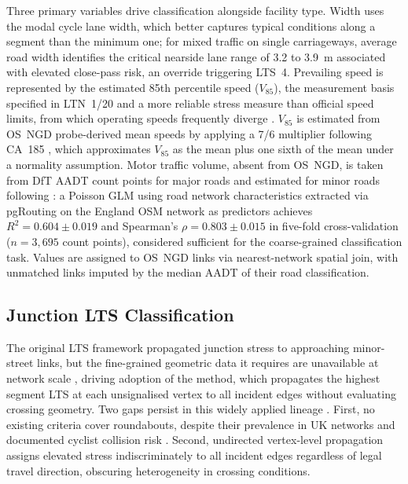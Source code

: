 \documentclass[final,5p,times,twocolumn,authoryear]{elsarticle}
\begin{document}
Three primary variables drive classification alongside facility type. Width uses the modal cycle lane width, which better captures typical conditions along a segment than the minimum one; for mixed traffic on single carriageways, average road width identifies the critical nearside lane range of 3.2 to 3.9~m associated with elevated close-pass risk, an override triggering LTS~4. Prevailing speed is represented by the estimated 85th percentile speed ($V_{85}$), the measurement basis specified in LTN~1/20 and a more reliable stress measure than official speed limits, from which operating speeds frequently diverge \citep{europeancommission2021, departmentfortransport2025b}. $V_{85}$ is estimated from OS~NGD probe-derived mean speeds by applying a 7/6 multiplier following CA~185 \citep{nationalhighways2019}, which approximates $V_{85}$ as the mean plus one sixth of the mean under a normality assumption. Motor traffic volume, absent from OS~NGD, is taken from DfT AADT count points for major roads and estimated for minor roads following \citet{morley2016}: a Poisson GLM using road network characteristics extracted via pgRouting on the England OSM network as predictors achieves $R^2 = 0.604 \pm 0.019$ and Spearman's $\rho = 0.803 \pm 0.015$ in five-fold cross-validation ($n = 3{,}695$ count points), considered sufficient for the coarse-grained classification task. Values are assigned to OS~NGD links via nearest-network spatial join, with unmatched links imputed by the median AADT of their road classification.

\subsection{Junction LTS Classification}
\label{sec:junction-lts}

The original LTS framework propagated junction stress to approaching minor-street links, but the fine-grained geometric data it requires are unavailable at network scale \citep{furth2018}, driving adoption of the \citet{conveyal2015} method, which propagates the highest segment LTS at each unsignalised vertex to all incident edges without evaluating crossing geometry. Two gaps persist in this widely applied lineage \citep{semler2017, murphy2019}. First, no existing criteria cover roundabouts, despite their prevalence in UK networks and documented cyclist collision risk \citep{daniels2009, aldred2021}. Second, undirected vertex-level propagation assigns elevated stress indiscriminately to all incident edges regardless of legal travel direction, obscuring heterogeneity in crossing conditions.
\end{document}
